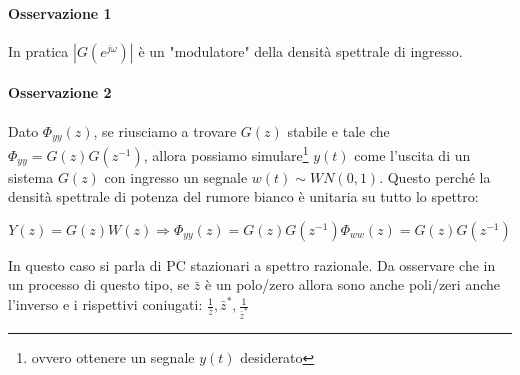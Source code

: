 \paragraph{Osservazione 1} In pratica $|G(e^{j\omega})|$ è un "modulatore" della densità spettrale di ingresso.
\paragraph{Osservazione 2} Dato $\Phi_{yy}(z)$, se riusciamo a trovare $G(z)$ stabile e tale che $\Phi_{yy}=G(z)G(z^{-1})$, allora possiamo simulare\footnote{ovvero ottenere un segnale $y(t)$ desiderato} $y(t)$ come l'uscita di un sistema $G(z)$ con ingresso un segnale $w(t)\sim WN(0,1)$. Questo perché la densità spettrale di potenza del rumore bianco è unitaria su tutto lo spettro:

  \[ Y(z)=G(z)W(z) \Longrightarrow  \Phi_{yy}(z)=G(z)G(z^{-1})\Phi_{ww}(z)=G(z)G(z^{-1}) \]
  
In questo caso si parla di PC stazionari a spettro razionale. Da osservare che in un processo di questo tipo, se $\bar{z}$ è un polo/zero allora sono anche poli/zeri anche l'inverso e i rispettivi coniugati: $\frac{1}{\bar{z}},\bar{z}^{*},\frac{1}{\bar{z}^{*}}$
